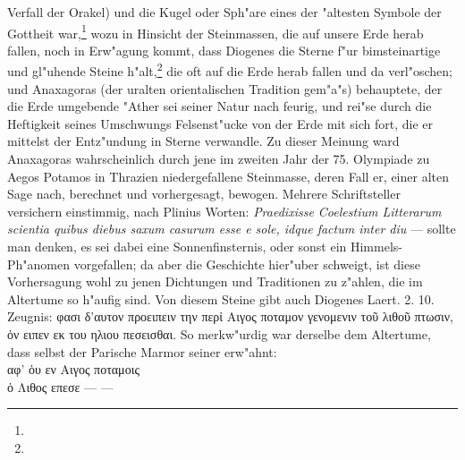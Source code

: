 \documentclass[a4paper, 11pt, oneside, polutonikogreek, german]{article}
\begin{document}
Verfall der Orakel) und die Kugel oder Sph"are eines der "altesten Symbole der Gottheit war,\footnote{} wozu in Hinsicht der Steinmassen, die auf unsere Erde herab fallen, noch in Erw"agung kommt, dass Diogenes die Sterne f"ur bimsteinartige und gl"uhende Steine h"alt,\footnote{} die oft auf die Erde herab fallen und da verl"oschen; und Anaxagoras (der uralten orientalischen Tradition gem"a"s) behauptete, der die Erde umgebende "Ather sei seiner Natur nach feurig, und rei"se durch die Heftigkeit seines Umschwungs Felsenst"ucke von der Erde mit sich fort, die er mittelst der Entz"undung in Sterne verwandle. Zu dieser Meinung ward Anaxagoras wahrscheinlich durch jene im zweiten Jahr der 75. Olympiade zu Aegos Potamos in Thrazien niedergefallene Steinmasse, deren Fall er, einer alten Sage nach, berechnet und vorhergesagt, bewogen. Mehrere Schriftsteller versichern einstimmig, nach Plinius Worten: \emph{Praedixisse Coelestium Litterarum scientia quibus diebus saxum casurum esse e sole, idque factum inter diu} --- sollte man denken, es sei dabei eine Sonnenfinsternis, oder sonst ein Himmels-Ph"anomen vorgefallen; da aber die Geschichte hier"uber schweigt, ist diese Vorhersagung wohl zu jenen Dichtungen und Traditionen zu z"ahlen, die im Altertume so h"aufig sind. Von diesem Steine gibt auch Diogenes Laert. 2. 10. Zeugnis: φασι δ'αυτον προειπειν την περἰ Αιγος ποταμον γενομενιν τοῦ λιθοῦ πτωσιν, ὀν ειπεν εκ του ηλιου πεσεισθαι. So merkw"urdig war derselbe dem Altertume, dass selbst der Parische Marmor seiner erw"ahnt:
\vspace{1pt}
\\
αφ' ὁυ εν Αιγος ποταμοις\\
ὁ Λιθος επεσε --- ---\\
\vspace{1pt}
\end{document}
